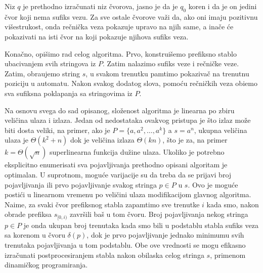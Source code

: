 \noindent
\begin{minipage}[l]{\textwidth}

\end{minipage}

Niz $q$ je prethodno izra\v cunati niz \v cvorova, jasno je da je $q_0$ koren i da je on jedini \v cvor koji nema sufiks vezu. Za sve ostale \v cvorove va\v zi da, ako oni imaju pozitivnu vi\v sestrukost, onda re\v cni\v cka veza pokazuje upravo na njih same, a ina\v ce \' ce pokazivati na isti \v cvor na koji pokazuje njihova sufiks veza.

Kona\v cno, opi\v simo rad celog algoritma. Prvo, konstrui\v semo prefiksno stablo ubacivanjem svih stringova iz $P$. Zatim nalazimo sufiks veze i re\v cni\v cke veze. Zatim, obra\dj ujemo string $s$, u svakom trenutku pamtimo pokaziva\v c na trenutnu poziciju u automatu. Nakon svakog dodatog slova, pomo\' cu re\v cni\v ckih veza obi\dj emo sva sufiksna poklapanja sa stringovima iz $P$.

\noindent
\begin{minipage}[l]{\textwidth}

\end{minipage}

Na osnovu svega do sad opisanog, slo\v zenost algoritma je linearna po zbiru veli\v cina ulaza i izlaza. Jedan od nedostataka ovakvog pristupa je \v sto izlaz mo\v ze biti dosta veliki, na primer, ako je $P = \{a, a^2, \ldots, a^k\}$ a $s = a^n$, ukupna veli\v cina ulaza je $\Theta(k^2+n)$ dok je veli\v cina izlaza $\Theta(kn)$, \v sto je za, na primer $k = \Theta(\sqrt{n})$ superlinearna funkcija du\v zine ulaza. Ukoliko je potrebno eksplicitno enumerisati sva pojavljivanja prethodno opisani algoritam je optimalan. U suprotnom, mogu\' ce varijacije su da treba da se prijavi broj pojavljivanja ili prvo pojavljivanje svakog stringa $p \in P$ u $s$. Ovo je mogu\' ce posti\' ci u linearnom vremenu po veli\v cini ulaza modifikacijom glavnog algoritma. Naime, za svaki \v cvor prefiksnog stabla zapamtimo sve trenutke $i$ kada smo, nakon obrade prefiksa $s_{[0, i)}$ zavr\v sili ba\v s u tom \v cvoru. Broj pojavljivanja nekog stringa $p \in P$ je onda ukupan broj trenutaka kada smo bili u podstablu stabla sufiks veza sa korenom u \v cvoru $\delta(p)$, dok je prvo pojavljivanje jednako minimumu svih trenutaka pojavljivanja u tom podstablu. Obe ove vrednosti se mogu efikasno izra\v cunati postprocesiranjem stabla nakon obilaska celog stringa $s$, primenom dinami\v ckog programiranja.
